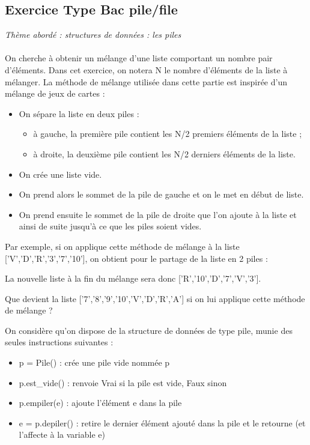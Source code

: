 \documentclass[a4paper, noanswers, addpoints, 12pt]{exam}
\begin{document}
\begin{questions}
\section{Exercice Type Bac pile/file}
\textit{Thème abordé : structures de données : les piles}\\\\
On cherche à obtenir un mélange d'une liste comportant un nombre pair d'éléments.
Dans cet exercice, on notera N le nombre d'éléments de la liste à mélanger.
La méthode de mélange utilisée dans cette partie est inspirée d'un mélange de jeux
de cartes :
\begin{itemize}
    \item On sépare la liste en deux piles :
    \begin{itemize}
        \item à gauche, la première pile contient les N/2 premiers éléments de la liste ;
        \item à droite, la deuxième pile contient les N/2 derniers éléments de la liste.
    \end{itemize}
    \item On crée une liste vide.
    \item On prend alors le sommet de la pile de gauche et on le met en début de liste.
    \item On prend ensuite le sommet de la pile de droite que l'on ajoute à la liste et ainsi
de suite jusqu'à ce que les piles soient vides.
\end{itemize}

Par exemple, si on applique cette méthode de mélange à la liste
['V','D','R','3','7','10'], on obtient pour le partage de la liste en 2 piles :
\begin{center}
    
\end{center}
La nouvelle liste à la fin du mélange sera donc ['R','10','D','7','V','3'].

\question[1] Que devient la liste ['7','8','9','10','V','D','R','A'] si on lui applique
cette méthode de mélange ?

On considère qu'on dispose de la structure de données de type pile, munie des
seules instructions suivantes :
\begin{itemize}
    \item p = Pile() : crée une pile vide nommée p
    \item p.est\_vide() : renvoie Vrai si la pile est vide, Faux sinon
    \item p.empiler(e) : ajoute l'élément e dans la pile
    \item e = p.depiler() : retire le dernier élément ajouté dans la pile et le retourne (et
l'affecte à la variable e)
\end{itemize}


\end{questions}
\end{document}
